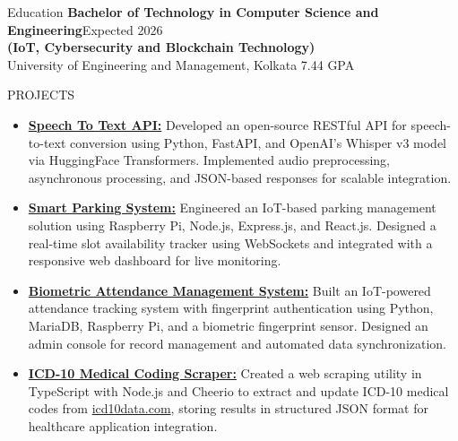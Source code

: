 \documentclass{resume}
\begin{document}
\vspace{-0.4em}
\begin{rSection}{Education}
	\textbf{Bachelor of Technology in Computer Science and Engineering}\hfill {Expected 2026}\\
	\textbf{(IoT, Cybersecurity and Blockchain Technology)}\\
	University of Engineering and Management, Kolkata \hfill  7.44 GPA
\end{rSection}
\vspace{-0.4em}
\begin{rSection}{PROJECTS}
	\begin{itemize}
		\item \textbf{\href{https://github.com/Arkapravo-Ghosh/speech-to-text}{Speech To Text API:}} Developed an open-source RESTful API for speech-to-text conversion using Python, FastAPI, and OpenAI's Whisper v3 model via HuggingFace Transformers. Implemented audio preprocessing, asynchronous processing, and JSON-based responses for scalable integration.

		\item \textbf{\href{https://github.com/Arkapravo-Ghosh/Smart-Parking-System}{Smart Parking System:}} Engineered an IoT-based parking management solution using Raspberry Pi, Node.js, Express.js, and React.js. Designed a real-time slot availability tracker using WebSockets and integrated with a responsive web dashboard for live monitoring.

		\item \textbf{\href{https://github.com/Arkapravo-Ghosh/attendance-monitoring-system}{Biometric Attendance Management System:}} Built an IoT-powered attendance tracking system with fingerprint authentication using Python, MariaDB, Raspberry Pi, and a biometric fingerprint sensor. Designed an admin console for record management and automated data synchronization.

		\item \textbf{\href{https://github.com/Arkapravo-Ghosh/icd10-scrapper}{ICD-10 Medical Coding Scraper:}} Created a web scraping utility in TypeScript with Node.js and Cheerio to extract and update ICD-10 medical codes from \href{https://www.icd10data.com}{icd10data.com}, storing results in structured JSON format for healthcare application integration.
	\end{itemize}
\end{rSection}
\vspace{-0.4em}
\end{document}

